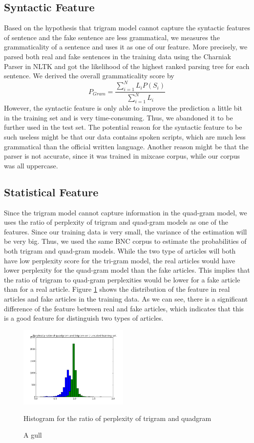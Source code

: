 \begin{itemize}
 
\end{itemize}


\subsection{Syntactic Feature}
Based on the hypothesis that trigram model cannot capture the syntactic features of sentence and the fake sentence are less grammatical, we measures the grammaticality of a sentence and uses it as one of our feature. More precisely, we parsed both real and fake sentences in the training data using the Charniak Parser in NLTK and got the likelihood of the highest ranked parsing tree for each sentence. We derived the overall grammaticality score by 
$$P_{Gram} = \frac{\sum_{i=1}^N L_iP(S_i)}{\sum_{i=1}^N L_i}$$
However, the syntactic feature is only able to improve the prediction a little bit in the training set and is very time-consuming. Thus, we abandoned it to be further used in the test set.
The potential reason for the syntactic feature to be such useless might be that our data contains spoken scripts, which are much less grammatical than the official written language. Another reason might be that the parser is not accurate, since it was trained in mixcase corpus, while our corpus was all uppercase.

\subsection{Statistical Feature}
Since the trigram model cannot capture information in the quad-gram model, we uses the ratio of perplexity of trigram and quad-gram models as one of the features. Since our training data is very small, the variance of the estimation will be very big. Thus, we used the same BNC corpus to estimate the probabilities of both trigram and quad-gram models. While the two type of articles will both have low perplexity score for the tri-gram model, the real articles would have lower perplexity for the quad-gram model than the fake articles. This implies that the ratio of trigram to quad-gram perplexities would be lower for a fake article than for a real article. Figure \ref{fig:ratio} shows the distribution of the feature in real articles and fake articles in the training data. As we can see, there is a significant difference of the feature between real and fake articles, which indicates that this is a good feature for distinguish two types of articles. 

\begin{figure}
  \begin{center}
    \includegraphics[width=0.48\textwidth]{./FIG/030/ratio}
    \caption{Histogram for the ratio of perplexity of trigram and quadgram} \label{fig:ratio}
  \end{center}
  \caption{A gull}
\end{figure}

